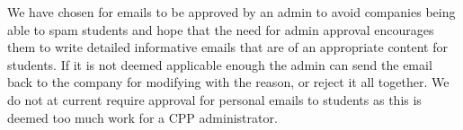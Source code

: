     We have chosen for emails to be approved by an admin to avoid companies being able to spam students and hope that the need for admin approval encourages them to write detailed informative emails that are of an appropriate content for students. If it is not deemed applicable enough the admin can send the email back to the company for modifying with the reason, or reject it all together.
    We do not at current require approval for personal emails to students as this is deemed too much work for a CPP administrator.  


